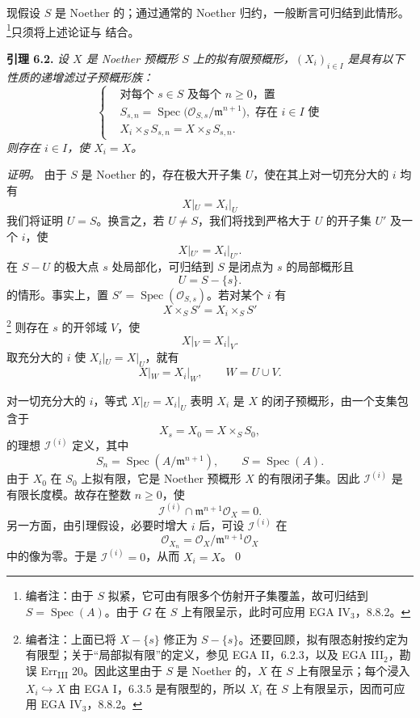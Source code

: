 现假设 \(S\) 是 Noether 的；通过通常的 Noether 归约，一般断言可归结到此情形。\footnote{编者注：由于 \(S\) 拟紧，它可由有限多个仿射开子集覆盖，故可归结到 \(S=\operatorname{Spec}(A)\)。由于 \(G\) 在 \(S\) 上有限呈示，此时可应用 EGA IV\(_3\)，8.8.2。}只须将上述论证与  结合。

\medskip
\noindent{}\textbf{引理 6.2.}
\textit{设 \(X\) 是 Noether 预概形 \(S\) 上的拟有限预概形，\((X_i)_{i\in I}\) 是具有以下性质的递增滤过子预概形族：
\[
\left\{
\begin{aligned}
 &\text{对每个 \(s\in S\) 及每个 \(n\geq0\)，置}\\
 &S_{s,n}
   =\operatorname{Spec}
      \bigl(\mathscr O_{S,s}/\mathfrak m^{n+1}\bigr),
   \text{ 存在 \(i\in I\) 使}\\
 &X_i\times_S S_{s,n}=X\times_S S_{s,n}.
\end{aligned}
\right.
\]
则存在 \(i\in I\)，使 \(X_i=X\)。}

\emph{证明。}
由于 \(S\) 是 Noether 的，存在极大开子集 \(U\)，使在其上对一切充分大的 \(i\) 均有
\[
  X|_U=X_i|_U
\]
我们将证明 \(U=S\)。换言之，若 \(U\neq S\)，我们将找到严格大于 \(U\) 的开子集 \(U'\) 及一个 \(i\)，使
\[
  X|_{U'}=X_i|_{U'}.
\]
在 \(S-U\) 的极大点 \(s\) 处局部化，可归结到 \(S\) 是闭点为 \(s\) 的局部概形且
\[
  U=S-\{s\}.
\]
的情形。事实上，置 \(S'=\operatorname{Spec}(\mathscr O_{S,s})\)。若对某个 \(i\) 有
\[
  X\times_S S'=X_i\times_S S'
\]
\footnote{编者注：上面已将 \(X-\{s\}\) 修正为 \(S-\{s\}\)。还要回顾，拟有限态射按约定为有限型；关于“局部拟有限”的定义，参见 EGA II，6.2.3，以及 EGA III\(_2\)，勘误 Err\textsubscript{III} 20。因此这里由于 \(S\) 是 Noether 的，\(X\) 在 \(S\) 上有限呈示；每个浸入 \(X_i\hookrightarrow X\) 由 EGA I，6.3.5 是有限型的，所以 \(X_i\) 在 \(S\) 上有限呈示，因而可应用 EGA IV\(_3\)，8.8.2。}
则存在 \(s\) 的开邻域 \(V\)，使
\[
  X|_V=X_i|_V.
\]
取充分大的 \(i\) 使 \(X_i|_U=X|_U\)，就有
\[
  X|_W=X_i|_W,
  \qquad W=U\cup V.
\]

对一切充分大的 \(i\)，等式 \(X|_U=X_i|_U\) 表明 \(X_i\) 是 \(X\) 的闭子预概形，由一个支集包含于
\[
  X_s=X_0=X\times_S S_0,
\]
的理想 \(\mathscr I^{(i)}\) 定义，其中
\[
  S_n=\operatorname{Spec}(A/\mathfrak m^{n+1}),
  \qquad S=\operatorname{Spec}(A).
\]
由于 \(X_0\) 在 \(S_0\) 上拟有限，它是 Noether 预概形 \(X\) 的有限闭子集。因此 \(\mathscr I^{(i)}\) 是有限长度模。故存在整数 \(n\geq0\)，使
\[
  \mathscr I^{(i)}
  \cap\mathfrak m^{n+1}\mathscr O_X=0.
\]
另一方面，由引理假设，必要时增大 \(i\) 后，可设 \(\mathscr I^{(i)}\) 在
\[
  \mathscr O_{X_n}
  =\mathscr O_X/\mathfrak m^{n+1}\mathscr O_X
\]
中的像为零。于是 \(\mathscr I^{(i)}=0\)，从而 \(X_i=X\)。\qed

